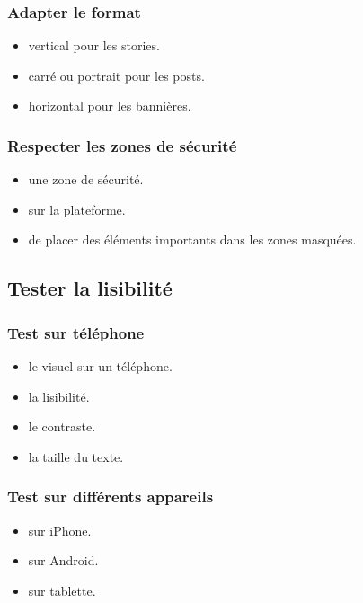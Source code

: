 \subsubsection{Adapter le format}

\begin{itemize}
    \item {} vertical pour les stories.
    \item {} carré ou portrait pour les posts.
    \item {} horizontal pour les bannières.
\end{itemize}

\subsubsection{Respecter les zones de sécurité}

\begin{itemize}
    \item {} une zone de sécurité.
    \item {} sur la plateforme.
    \item {} de placer des éléments importants dans les zones masquées.
\end{itemize}

\subsection{Tester la lisibilité}

\subsubsection{Test sur téléphone}

\begin{itemize}
    \item {} le visuel sur un téléphone.
    \item {} la lisibilité.
    \item {} le contraste.
    \item {} la taille du texte.
\end{itemize}

\subsubsection{Test sur différents appareils}

\begin{itemize}
    \item {} sur iPhone.
    \item {} sur Android.
    \item {} sur tablette.
\end{itemize}

